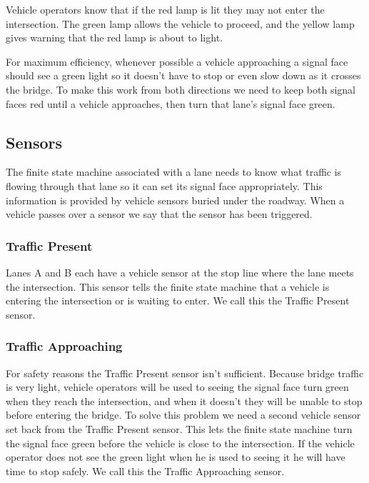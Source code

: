 \documentclass[letterpaper,twoside]{article}
\begin{document}
Vehicle operators know that if the red lamp is lit they may not
enter the intersection.  The green lamp allows the vehicle to
proceed, and the yellow lamp gives warning that the red lamp
is about to light.

For maximum efficiency, whenever possible a vehicle approaching
a signal face should see a green light so it doesn't have to
stop or even slow down as it crosses the bridge.  To make this
work from both directions we need to keep both signal faces red
until a vehicle approaches, then turn that lane's signal face
green.

\subsection{Sensors}

The finite state machine associated with a lane needs to know
what traffic is flowing through that lane so it can set its
signal face appropriately.  This information is provided
by vehicle sensors buried under the roadway.
When a vehicle passes over a sensor we say that the sensor
has been triggered.

\subsubsection{Traffic Present}

Lanes A and B each have a vehicle sensor at the stop line where the lane
meets the intersection.  This sensor tells the finite state machine
that a vehicle is entering the intersection or is waiting to enter.
We call this the Traffic Present sensor.

\subsubsection{Traffic Approaching}

For safety reasons the Traffic Present sensor isn't sufficient.
Because bridge traffic is very light, vehicle operators will be
used to seeing the signal face turn green when they reach
the intersection, and when it doesn't they will be unable to stop
before entering the bridge.  To solve this problem we need a
second vehicle sensor set back from the Traffic Present sensor.
This lets the finite state machine turn the signal face green
before the vehicle is
close to the intersection.  If the vehicle operator does not
see the green light when he is used to seeing it he will have
time to stop safely.  We call this the Traffic Approaching sensor.
\end{document}
